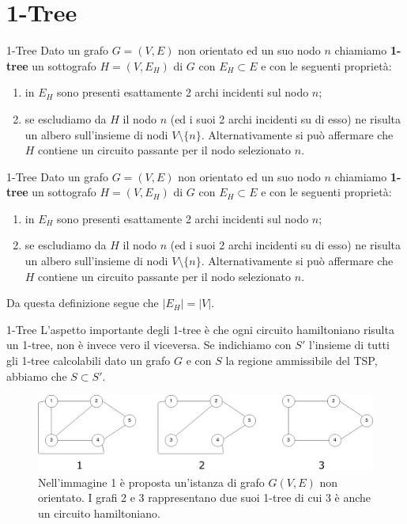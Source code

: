 \documentclass[10pt]{beamer}
\begin{document}
\section{1-Tree}

\begin{frame}{1-Tree}
    Dato un grafo $G=(V,E)$ non orientato ed un suo nodo $n$ chiamiamo \textbf{1-tree} un sottografo $H = (V, E_H)$ di $G$ con $E_H \subset E$ e con le seguenti proprietà:
    \begin{enumerate}[<+->]
        \item in $E_H$ sono presenti esattamente 2 archi incidenti sul nodo $n$;
        \item se escludiamo da $H$ il nodo $n$ (ed i suoi 2 archi incidenti su di esso) ne risulta un albero sull'insieme di nodi $V \setminus \{n\}$. \newline Alternativamente si può affermare che $H$ contiene un circuito passante per il nodo selezionato $n$.
    \end{enumerate}
\end{frame}

\begin{frame}{1-Tree}
    Dato un grafo $G=(V,E)$ non orientato ed un suo nodo $n$ chiamiamo \textbf{1-tree} un sottografo $H = (V, E_H)$ di $G$ con $E_H \subset E$ e con le seguenti proprietà:
    \begin{enumerate}
        \item in $E_H$ sono presenti esattamente 2 archi incidenti sul nodo $n$;
        \item se escludiamo da $H$ il nodo $n$ (ed i suoi 2 archi incidenti su di esso) ne risulta un albero sull'insieme di nodi $V \setminus \{n\}$. \newline Alternativamente si può affermare che $H$ contiene un circuito passante per il nodo selezionato $n$.
    \end{enumerate}
    Da questa definizione segue che $|E_H| = |V|$.
\end{frame}

\begin{frame}{1-Tree}
    L'aspetto importante degli 1-tree è che ogni circuito hamiltoniano risulta un 1-tree, non è invece vero il viceversa. Se indichiamo con $S'$ l'insieme di tutti gli 1-tree calcolabili dato un grafo $G$ e con $S$ la regione ammissibile del TSP, abbiamo che $S \subset S'$.
    
    \begin{figure}
        \centering
         \includegraphics[scale=0.21]{files/1TreeEsempi.png}
        \caption{Nell'immagine 1 è proposta un'istanza di grafo $G(V,E)$ non orientato. I grafi 2 e 3 rappresentano due suoi 1-tree di cui 3 è anche un circuito hamiltoniano.}
    \end{figure}
       
   
\end{frame}
\end{document}
